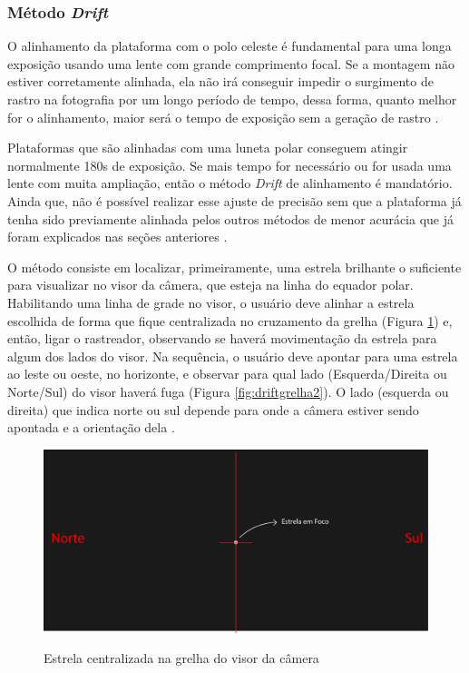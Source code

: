 \subsubsection{Método \textit{Drift}}

O alinhamento da plataforma com o polo celeste é fundamental para uma longa exposição usando uma lente com grande comprimento focal. Se a montagem não estiver corretamente alinhada, ela não irá conseguir impedir o surgimento de rastro na fotografia por um longo período de tempo, dessa forma, quanto melhor for o alinhamento, maior será o tempo de exposição sem a geração de rastro \cite{book:bbcsky}.  

Plataformas que são alinhadas com uma luneta polar conseguem atingir normalmente 180s de exposição. Se mais tempo for necessário ou for usada uma lente com muita ampliação, então o método \textit{Drift} de alinhamento é mandatório. Ainda que, não é possível realizar esse ajuste de precisão sem que a plataforma já tenha sido previamente alinhada pelos outros métodos de menor acurácia que já foram explicados nas seções anteriores \cite{book:bbcsky}. 

O método consiste em localizar, primeiramente, uma estrela brilhante o suficiente para visualizar no visor da câmera, que esteja na linha do equador polar. Habilitando uma linha de grade no visor, o usuário deve alinhar a estrela escolhida de forma que fique centralizada no cruzamento da grelha (Figura \ref{fig:driftgrelha1}) e, então, ligar o rastreador, observando se haverá movimentação da estrela para algum dos lados do visor. Na sequência, o usuário deve apontar para uma estrela ao leste ou oeste, no horizonte, e observar para qual lado (Esquerda/Direita ou Norte/Sul) do visor haverá fuga (Figura \ref{fig:driftgrelha2}). O lado (esquerda ou direita) que indica norte ou sul depende para onde a câmera estiver sendo apontada e a orientação dela \cite{book:bbcsky}.

\begin{figure}[!htb]
	\centering
	\caption{Estrela centralizada na grelha do visor da câmera}
	\includegraphics[width=0.7\linewidth]{figuras/driftgrelha1}
	\label{fig:driftgrelha1}
\end{figure}

